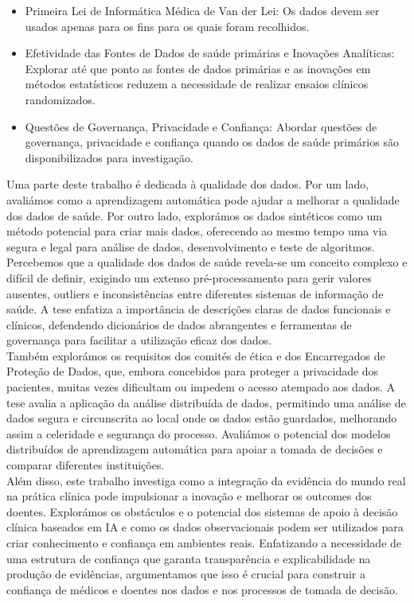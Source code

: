 \begin{itemize}
    \item Primeira Lei de Informática Médica de Van der Lei: Os dados devem ser usados apenas para os fins para os quais foram recolhidos.
    \item Efetividade das Fontes de Dados de saúde primárias e Inovações Analíticas: Explorar até que ponto as fontes de dados primárias e as inovações em métodos estatísticos reduzem a necessidade de realizar ensaios clínicos randomizados.
    \item Questões de Governança, Privacidade e Confiança: Abordar questões de governança, privacidade e confiança quando os dados de saúde primários são disponibilizados para investigação.

\end{itemize}

Uma parte deste trabalho é dedicada à qualidade dos dados. Por um lado, avaliámos como a aprendizagem automática pode ajudar a melhorar a qualidade dos dados de saúde. Por outro lado, explorámos os dados sintéticos como um método potencial para criar mais dados, oferecendo ao mesmo tempo uma via segura e legal para análise de dados, desenvolvimento e teste de algoritmos. Percebemos que a qualidade dos dados de saúde revela-se um conceito complexo e difícil de definir, exigindo um extenso pré-processamento para gerir valores ausentes, outliers e inconsistências entre diferentes sistemas de informação de saúde. A tese enfatiza a importância de descrições claras de dados funcionais e clínicos, defendendo dicionários de dados abrangentes e ferramentas de governança para facilitar a utilização eficaz dos dados. \\

Também explorámos os requisitos dos comités de ética e dos Encarregados de Proteção de Dados, que, embora concebidos para proteger a privacidade dos pacientes, muitas vezes dificultam ou impedem o acesso atempado aos dados. A tese avalia a aplicação da análise distribuída de dados, permitindo uma análise de dados segura e circunscrita ao local onde os dados estão guardados, melhorando assim a celeridade e segurança do processo. Avaliámos o potencial dos modelos distribuídos de aprendizagem automática para apoiar a tomada de decisões e comparar diferentes instituições. \\

Além disso, este trabalho investiga como a integração da evidência do mundo real na prática clínica pode impulsionar a inovação e melhorar os outcomes dos doentes. Explorámos os obstáculos e o potencial dos sistemas de apoio à decisão clínica baseados em IA e como os dados observacionais podem ser utilizados para criar conhecimento e confiança em ambientes reais. Enfatizando a necessidade de uma estrutura de confiança que garanta transparência e explicabilidade na produção de evidências, argumentamos que isso é crucial para construir a confiança de médicos e doentes nos dados e nos processos de tomada de decisão. \\

